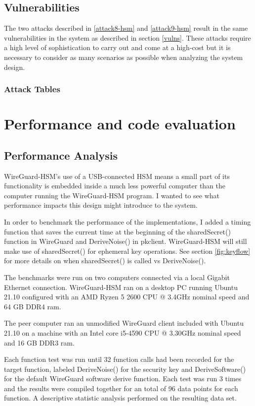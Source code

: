 \documentclass [11pt, proquest] {uwthesis}[2020/02/24]
\begin{document}
\section{Vulnerabilities}
\label{hsm-vulns}
The two attacks described in \ref{attack8-hsm} and \ref{attack9-hsm} result in the same vulnerabilities in the system as described in section \ref{vulns}. These attacks require a high level of sophistication to carry out and come at a high-cost but it is necessary to consider as many scenarios as possible when analyzing the system design.

\subsection{Attack Tables}


\chapter{Performance and code evaluation}
\section{Performance Analysis}

\label{performance}
WireGuard-HSM's use of a USB-connected HSM means a small part of its functionality is embedded inside a much less powerful computer than the computer running the WireGuard-HSM program. I wanted to see what performance impacts this design might introduce to the system. 

In order to benchmark the performance of the implementations, I added a timing function that saves the current time at the beginning of the sharedSecret() function in WireGuard and DeriveNoise() in pkclient. WireGuard-HSM will still make use of sharedSecret() for ephemeral key operations.
See section \ref{fig:keyflow} for more details on when sharedSecret() is called vs DeriveNoise().

The benchmarks were run on two computers connected via a local Gigabit Ethernet connection. 
WireGuard-HSM ran on a desktop PC running Ubuntu 21.10 configured with an AMD Ryzen 5 2600 CPU @ 3.4GHz nominal speed and 64 GB DDR4 ram. 

The peer computer ran an unmodified WireGuard client included with Ubuntu 21.10 on a machine with an Intel core i5-4590 CPU @ 3.30GHz nominal speed and 16 GB DDR3 ram.  

Each function test was run until 32 function calls had been recorded for the target function, labeled DeriveNoise() for the security key and DeriveSoftware() for the default WireGuard software derive function.
Each test was run 3 times and the results were compiled together for an total of 96 data points for each function. A descriptive statistic analysis performed on the resulting data set.
\end{document}
